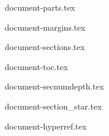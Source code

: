 \documentclass[presentatie.tex]{subfiles}
\begin{document}
    \clearrecentlist

    {document-parts.tex}

	{document-margins.tex}

	{document-sections.tex}

	{document-toc.tex}

	{document-secnumdepth.tex}

	{document-section_star.tex}

	{document-hyperref.tex}
\end{document}
